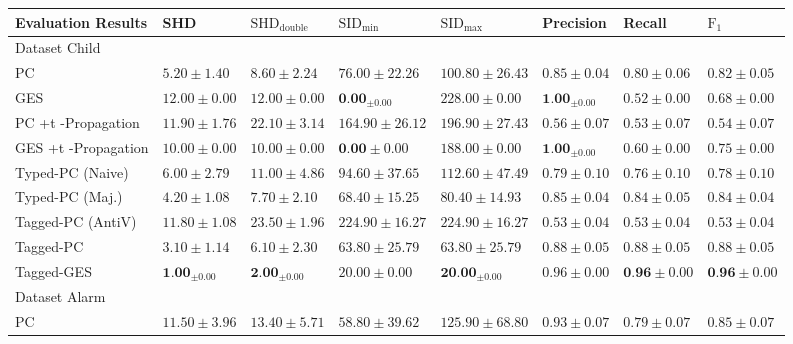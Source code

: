 \documentclass[10pt]{article}
\begin{document}
\begin{table}[h]
\begin{center}
\begin{tabular}{|l|l|l|l|l|l|l|l|}
\hline
Evaluation Results & SHD & $\mathrm{SHD}_{\text {double }}$ & $\mathrm{SID}_{\text {min }}$ & $\mathrm{SID}_{\text {max }}$ & Precision & Recall & $\mathrm{F}_{1}$ \\
\hline
Dataset Child & \multicolumn{7}{|c|}{} \\
\hline
PC & $5.20 \pm 1.40$ & $8.60 \pm 2.24$ & $76.00 \pm 22.26$ & $100.80 \pm 26.43$ & $0.85 \pm 0.04$ & $0.80 \pm 0.06$ & $0.82 \pm 0.05$ \\
\hline
GES & $12.00 \pm 0.00$ & $12.00 \pm 0.00$ & $\mathbf{0 . 0 0}_{ \pm 0.00}$ & $228.00 \pm 0.00$ & $\mathbf{1 . 0 0}_{ \pm 0.00}$ & $0.52 \pm 0.00$ & $0.68 \pm 0.00$ \\
\hline
PC +t -Propagation & $11.90 \pm 1.76$ & $22.10 \pm 3.14$ & $164.90 \pm 26.12$ & $196.90 \pm 27.43$ & $0.56 \pm 0.07$ & $0.53 \pm 0.07$ & $0.54 \pm 0.07$ \\
\hline
GES +t -Propagation & $10.00 \pm 0.00$ & $10.00 \pm 0.00$ & $\mathbf{0 . 0 0} \pm 0.00$ & $188.00 \pm 0.00$ & $\mathbf{1 . 0 0}_{ \pm 0.00}$ & $0.60 \pm 0.00$ & $0.75 \pm 0.00$ \\
\hline
Typed-PC (Naive) & $6.00 \pm 2.79$ & $11.00 \pm 4.86$ & $94.60 \pm 37.65$ & $112.60 \pm 47.49$ & $0.79 \pm 0.10$ & $0.76 \pm 0.10$ & $0.78 \pm 0.10$ \\
\hline
Typed-PC (Maj.) & $4.20 \pm 1.08$ & $7.70 \pm 2.10$ & $68.40 \pm 15.25$ & $80.40 \pm 14.93$ & $0.85 \pm 0.04$ & $0.84 \pm 0.05$ & $0.84 \pm 0.04$ \\
\hline
Tagged-PC (AntiV) & $11.80 \pm 1.08$ & $23.50 \pm 1.96$ & $224.90 \pm 16.27$ & $224.90 \pm 16.27$ & $0.53 \pm 0.04$ & $0.53 \pm 0.04$ & $0.53 \pm 0.04$ \\
\hline
Tagged-PC & $3.10 \pm 1.14$ & $6.10 \pm 2.30$ & $63.80 \pm 25.79$ & $63.80 \pm 25.79$ & $0.88 \pm 0.05$ & $0.88 \pm 0.05$ & $0.88 \pm 0.05$ \\
\hline
Tagged-GES & $\mathbf{1 . 0 0}_{ \pm 0.00}$ & $\mathbf{2 . 0 0}_{ \pm 0.00}$ & $20.00 \pm 0.00$ & $\mathbf{2 0 . 0 0}_{ \pm 0.00}$ & $0.96 \pm 0.00$ & $\mathbf{0 . 9 6} \pm 0.00$ & $\mathbf{0 . 9 6} \pm 0.00$ \\
\hline
Dataset Alarm & \multicolumn{7}{|c|}{} \\
\hline
PC & $11.50 \pm 3.96$ & $13.40 \pm 5.71$ & $58.80 \pm 39.62$ & $125.90 \pm 68.80$ & $0.93 \pm 0.07$ & $0.79 \pm 0.07$ & $0.85 \pm 0.07$ \\

\end{tabular}
\end{center}
\end{table}
\end{document}
